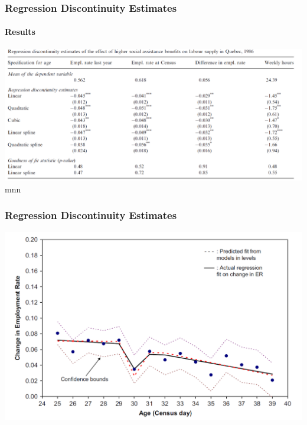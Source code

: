 \documentclass{beamer}
\begin{document}

\begin{frame}
\frametitle{Regression Discontinuity Estimates}
\framesubtitle{Results}

\begin{center}

	\includegraphics[width=1\linewidth]{table_1.PNG}mnn
	
\end{center}

\end{frame}




\begin{frame}
\frametitle{Regression Discontinuity Estimates}


\begin{center}

	\includegraphics[width=.95\linewidth]{fig_5.PNG}
	
\end{center}

\end{frame}
\end{document}
